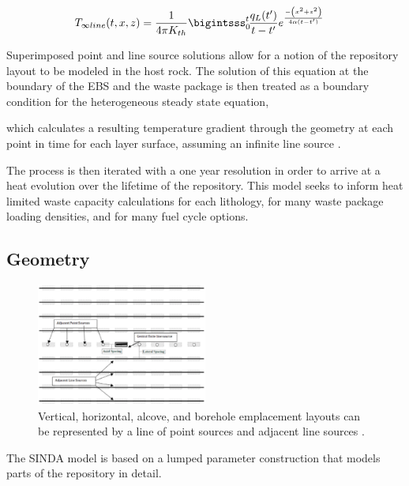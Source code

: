 \documentclass{anstrans}
\begin{document}
\begin{align}
  T_{\infty line}(t,x,z) &= \frac{1}{4\pi K_{th}} 
  \bigintsss_0^t\!\frac{q_L(t')}{t-t'}e^{ \frac{-\left(x^2 + z^2\right)}{4\alpha 
  (t-t')} }
  \label{infline}
\end{align}

Superimposed point and line source solutions allow for a notion of the 
repository layout to be modeled in the host rock. The solution of this equation 
at the boundary of the EBS and the waste package is then treated as a boundary 
condition for the heterogeneous steady state equation, 

which calculates a resulting temperature gradient through the geometry at each 
point in time for each layer surface, assuming an infinite line source 
\cite{hardin_generic_2011}.

The process is then iterated with a one year resolution in order to arrive at a 
heat evolution over  the lifetime of the repository. This model seeks to inform 
heat limited waste capacity calculations for each lithology, for many waste 
package loading densities, and for many fuel cycle options.  


\subsection{Geometry}

\begin{figure}[h!]
  \begin{center}
    \includegraphics[width=0.5\textwidth]{llnlConcept.eps}
  \end{center}
  \caption{Vertical, horizontal, alcove, and borehole emplacement layouts can be 
  represented by a line of point sources and adjacent line sources 
  \cite{sutton_investigations_2011}.}
  \label{fig:llnl}
\end{figure}


The SINDA model is based on a lumped parameter construction that models parts of 
the repository in detail. 
\end{document}
